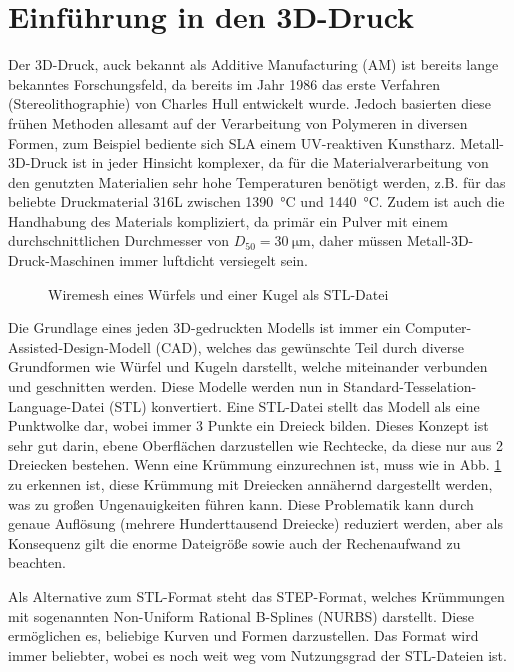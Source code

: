 \documentclass[main.tex]{subfiles}
\begin{document}
\section{Einführung in den 3D-Druck}
Der 3D-Druck, auck bekannt als Additive Manufacturing (AM) ist bereits lange bekanntes Forschungsfeld, da bereits im Jahr 1986 das erste Verfahren (Stereolithographie) von Charles Hull entwickelt wurde. Jedoch basierten diese frühen Methoden allesamt auf der Verarbeitung von Polymeren in diversen Formen, zum Beispiel bediente sich SLA einem UV-reaktiven Kunstharz. \parencite{BHATIA20231060}
Metall-3D-Druck ist in jeder Hinsicht komplexer, da für die Materialverarbeitung von den genutzten Materialien sehr hohe Temperaturen benötigt werden, z.B. für das beliebte Druckmaterial 316L zwischen  \qty{1390}{\celsius} und \qty{1440}{\degreeCelsius}\parencite{610LSTEEL}. Zudem ist auch die Handhabung des Materials kompliziert, da primär ein Pulver mit einem durchschnittlichen Durchmesser von $D_{50}=\SI{30}{\micro\meter}$\parencite[~S.3]{ZAKRZEWSKI2020115}, daher müssen Metall-3D-Druck-Maschinen immer luftdicht versiegelt sein.
\begin{figure}[h!]
\begin{center}
	\caption{Wiremesh eines Würfels und einer Kugel als STL-Datei}
	\label{img:stl_1}
\end{center}
\end{figure}	

Die Grundlage eines jeden 3D-gedruckten Modells ist immer ein Computer-Assisted-Design-Modell (CAD), welches das gewünschte Teil durch diverse Grundformen wie Würfel und Kugeln darstellt, welche miteinander verbunden und geschnitten werden. Diese Modelle werden nun in Standard-Tesselation-Language-Datei (STL) konvertiert. Eine STL-Datei stellt das Modell als eine Punktwolke dar, wobei immer 3 Punkte ein Dreieck bilden.
Dieses Konzept ist sehr gut darin, ebene Oberflächen darzustellen wie Rechtecke, da diese nur aus 2 Dreiecken bestehen. Wenn eine Krümmung einzurechnen ist, muss wie in Abb. \ref{img:stl_1} zu erkennen ist, diese Krümmung mit Dreiecken annähernd dargestellt werden, was zu großen Ungenauigkeiten führen kann. Diese Problematik kann durch genaue Auflösung (mehrere Hunderttausend Dreiecke) reduziert werden, aber als Konsequenz gilt die enorme Dateigröße sowie auch der Rechenaufwand zu beachten. \parencite{ADOBLESTL} 

Als Alternative zum STL-Format steht das STEP-Format, welches Krümmungen mit sogenannten Non-Uniform Rational B-Splines (NURBS) darstellt.
Diese ermöglichen es, beliebige Kurven und Formen darzustellen. Das Format wird immer beliebter, wobei es noch weit weg vom Nutzungsgrad der STL-Dateien ist. \parencite{ADOBESTEP}
\end{document}
